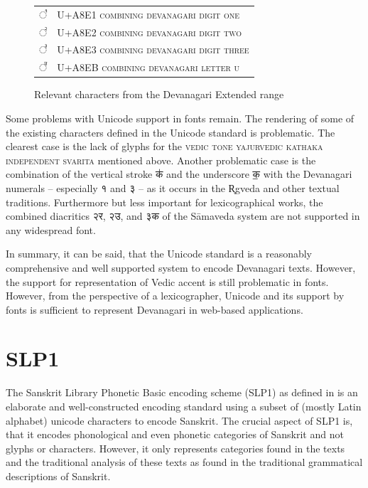 \begin{figure}[!ht]
\begin{center}
\begin{tabular}{ll}
	{\devfont ◌꣡	}& U+A8E1 \textsc{combining devanagari digit one}\\
	{\devfont ◌꣢}& U+A8E2 \textsc{combining devanagari digit two}\\
	{\devfont ◌꣣	}& U+A8E3 \textsc{combining devanagari digit three}\\
	{\devfont ◌꣫	}& U+A8EB \textsc{combining devanagari letter u}
\end{tabular}
\end{center}
\caption[Relevant characters from the Devanagari Extended range]{\label{tab:unidevext}Relevant characters from the Devanagari Extended range}
\end{figure}



Some problems with Unicode support in fonts remain. The rendering of some of the existing characters defined in the Unicode standard is problematic. The clearest case is the lack of glyphs for the \textsc{vedic tone yajurvedic kathaka independent svarita} mentioned above. Another problematic case is the combination of the vertical stroke {\devfont क॑} and the underscore {\devfont क॒} with the Devanagari numerals – especially {\devfont १} and {\devfont ३} – as it occurs in the R̥gveda and other textual traditions. Furthermore but less important for lexicographical works, the combined diacritics {\devfont २र}, {\devfont २उ}, and {\devfont ३क} of the Sāmaveda system are not supported in any widespread font.

In summary, it can be said, that the Unicode standard is a reasonably comprehensive and well supported system to encode Devanagari texts. However, the support for representation of Vedic accent is still problematic in fonts. However, from the perspective of a lexicographer, Unicode and its support by fonts is sufficient to represent Devanagari in web-based applications.

\section{SLP1}

The Sanskrit Library Phonetic Basic encoding scheme (SLP1) as defined in \citet{ScharfHyman2011} is an elaborate and well-constructed encoding standard using a subset of (mostly Latin alphabet) unicode characters to encode Sanskrit. The crucial aspect of SLP1 is, that it encodes phonological and even phonetic categories of Sanskrit and not glyphs or characters. However, it only represents categories found in the texts and the traditional analysis of these texts as found in the traditional grammatical descriptions of Sanskrit.

